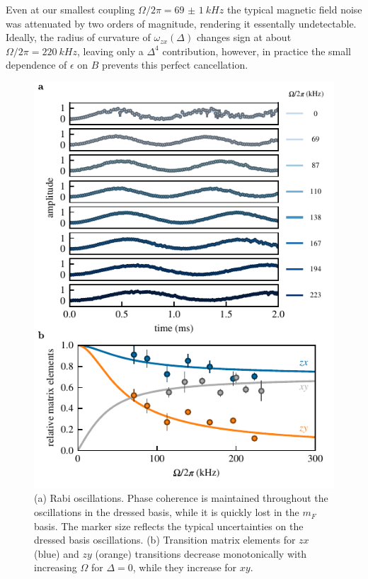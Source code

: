 Even at our smallest coupling $\Omega/2\pi=\SI{69(1)}{kHz}$ the typical magnetic field noise was attenuated by two orders of magnitude, rendering it essentally undetectable.
Ideally, the radius of curvature of $\omega_{zx}(\Delta)$ changes sign at about $\Omega/2\pi = \SI{220}{kHz}$, leaving only a $\Delta^4$ contribution, however, in practice the small dependence of $\epsilon$ on $B$ prevents this perfect cancellation.
\begin{figure}[h]
    \centering
    \includegraphics[]{Figures/Chapter6/fig3.pdf}
    \caption[Coherent driving of dressed state transitions]{(a) Rabi oscillations.
    Phase coherence is maintained throughout the oscillations in the dressed basis, while it is quickly lost in the $m_F$ basis.
    The marker size reflects the typical uncertainties on the dressed basis oscillations.
    (b) Transition matrix elements for $zx$ (blue) and $zy$ (orange) transitions decrease monotonically with increasing $\Omega$ for $\Delta=0$, while they increase for $xy$.
    }
    \label{fig:3}
\end{figure}

